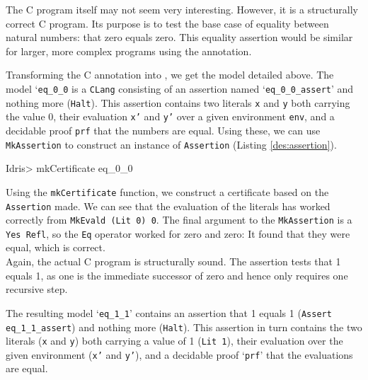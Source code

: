         The C program itself may not seem very interesting. However, it is a structurally correct C program. Its purpose is to test the base case of equality between natural numbers: that zero equals zero. This equality assertion would be similar for larger, more complex programs using the annotation.
        
        
        Transforming the C annotation into \Idris, we get the model detailed above. The model `\texttt{eq\_0\_0} is a \texttt{CLang} consisting of an assertion named `\texttt{eq\_0\_0\_assert}' and nothing more (\texttt{Halt}). This assertion contains two literals \texttt{x} and \texttt{y} both carrying the value 0, their evaluation \texttt{x'} and \texttt{y'} over a given environment \texttt{env}, and a decidable proof \texttt{prf} that the numbers are equal. Using these, we can use \texttt{MkAssertion} to construct an instance of \texttt{Assertion} (Listing \ref{des:assertion}).
        
        \newpage
        
        \begin{code}
Idris> mkCertificate eq_0_0
        \end{code}
        
        Using the \texttt{mkCertificate} function, we construct a certificate based on the \texttt{Assertion} made. We can see that the evaluation of the literals has worked correctly from \texttt{MkEvald (Lit 0) 0}. The final argument to the \texttt{MkAssertion} is a \texttt{Yes Refl}, so the \texttt{Eq} operator worked for zero and zero: It found that they were equal, which is correct.
        \\
        
        
        
        Again, the actual C program is structurally sound. The assertion tests that 1 equals 1, as one is the immediate successor of zero and hence only requires one recursive step.
        
        
        The resulting \Idris model `\texttt{eq\_1\_1}' contains an assertion that 1 equals 1 (\texttt{Assert eq\_1\_1\_assert}) and nothing more (\texttt{Halt}). This assertion in turn contains the two literals (\texttt{x} and \texttt{y}) both carrying a value of 1 (\texttt{Lit 1}), their evaluation over the given environment (\texttt{x'} and \texttt{y'}), and a decidable proof `\texttt{prf}' that the evaluations are equal.
        
